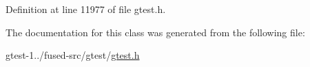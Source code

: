 \-Definition at line 11977 of file gtest.\-h.



\-The documentation for this class was generated from the following file\-:\begin{DoxyCompactItemize}
\item 
gtest-\/1../fused-\/src/gtest/\hyperlink{fused-src_2gtest_2gtest_8h}{gtest.\-h}\end{DoxyCompactItemize}
